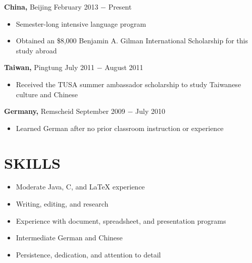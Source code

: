 \documentclass{res} %
\begin{document}
\begin{resume}
{\bf China,} Beijing \hfill February 2013 $-$ Present %
\begin{itemize}[label={--}]
	\item Semester-long intensive language program
	\item Obtained an \$8,000 Benjamin A. Gilman International Scholarship for this study abroad
\end{itemize}

{\bf Taiwan,} Pingtung \hfill July 2011 $-$ August 2011 %
\begin{itemize}[label={--}]
	\item Received the TUSA summer ambassador scholarship to study Taiwanese culture and Chinese
\end{itemize}

{\bf Germany,} Remscheid \hfill September 2009 $-$ July 2010 %
\begin{itemize}[label={--}]
	\item Learned German after no prior classroom instruction or experience
\end{itemize}

\section{SKILLS}

\begin{itemize}[label={--}]
	\item Moderate Java, C, and LaTeX experience
	\item Writing, editing, and research
	\item Experience with document, spreadsheet, and presentation programs
	\item Intermediate German and Chinese
	\item Persistence, dedication, and attention to detail
\end{itemize}

\end{resume}
\end{document}
